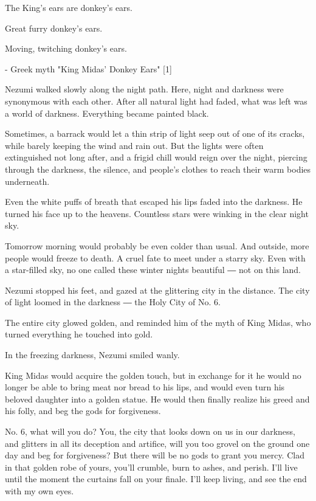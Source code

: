 The King's ears are donkey's ears.

Great furry donkey's ears.

Moving, twitching donkey's ears.

- Greek myth "King Midas' Donkey Ears" {[}1{]}

Nezumi walked slowly along the night path. Here, night and darkness were
synonymous with each other. After all natural light had faded, what was
left was a world of darkness. Everything became painted black.

Sometimes, a barrack would let a thin strip of light seep out of one of
its cracks, while barely keeping the wind and rain out. But the lights
were often extinguished not long after, and a frigid chill would reign
over the night, piercing through the darkness, the silence, and people's
clothes to reach their warm bodies underneath.~

Even the white puffs of breath that escaped his lips faded into the
darkness. He turned his face up to the heavens. Countless stars were
winking in the clear night sky.

Tomorrow morning would probably be even colder than usual. And outside,
more people would freeze to death. A cruel fate to meet under a starry
sky. Even with a star-filled sky, no one called these winter nights
beautiful ― not on this land.

Nezumi stopped his feet, and gazed at the glittering city in the
distance. The city of light loomed in the darkness ― the Holy City of
No. 6.

The entire city glowed golden, and reminded him of the myth of King
Midas, who turned everything he touched into gold.

In the freezing darkness, Nezumi smiled wanly.

King Midas would acquire the golden touch, but in exchange for it he
would no longer be able to bring meat nor bread to his lips, and would
even turn his beloved daughter into a golden statue. He would then
finally realize his greed and his folly, and beg the gods for
forgiveness.

No. 6, what will you do? You, the city that looks down on us in our
darkness, and glitters in all its deception and artifice, will you too
grovel on the ground one day and beg for forgiveness? But there will be
no gods to grant you mercy. Clad in that golden robe of yours, you'll
crumble, burn to ashes, and perish. I'll live until the moment the
curtains fall on your finale. I'll keep living, and see the end with my
own eyes.

